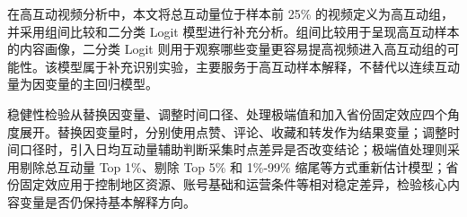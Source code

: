在高互动视频分析中，本文将总互动量位于样本前 25\% 的视频定义为高互动组，并采用组间比较和二分类 Logit 模型进行补充分析。组间比较用于呈现高互动样本的内容画像，二分类 Logit 则用于观察哪些变量更容易提高视频进入高互动组的可能性。该模型属于补充识别实验，主要服务于高互动样本解释，不替代以连续互动量为因变量的主回归模型。

稳健性检验从替换因变量、调整时间口径、处理极端值和加入省份固定效应四个角度展开。替换因变量时，分别使用点赞、评论、收藏和转发作为结果变量；调整时间口径时，引入日均互动量辅助判断采集时点差异是否改变结论；极端值处理则采用剔除总互动量 Top 1\%、剔除 Top 5\% 和 1\%-99\% 缩尾等方式重新估计模型；省份固定效应用于控制地区资源、账号基础和运营条件等相对稳定差异，检验核心内容变量是否仍保持基本解释方向。
